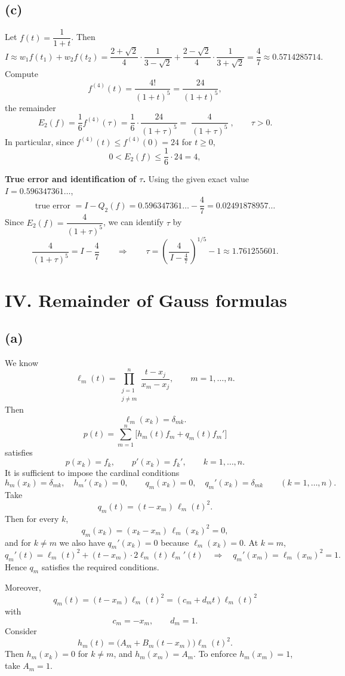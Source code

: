 \documentclass[a4paper]{article}
\begin{document}
\subsection*{(c)}
Let \(f(t)=\dfrac{1}{1+t}\). Then
\[
I \approx w_1 f(t_1)+w_2 f(t_2)
=\frac{2+\sqrt2}{4}\cdot\frac{1}{3-\sqrt2}
+\frac{2-\sqrt2}{4}\cdot\frac{1}{3+\sqrt2}
=\frac{4}{7}\approx 0.5714285714.
\]
Compute
\[
f^{(4)}(t)=\frac{4!}{(1+t)^5}=\frac{24}{(1+t)^5},
\]
the remainder
\[
E_2(f)=\frac{1}{6}f^{(4)}(\tau)=\frac{1}{6}\cdot\frac{24}{(1+\tau)^5}
=\boxed{\;\frac{4}{(1+\tau)^5}\;},\qquad \tau>0.
\]
In particular, since \(f^{(4)}(t)\le f^{(4)}(0)=24\) for \(t\ge 0\),
\[
0<E_2(f)\le \frac{1}{6}\cdot 24 = 4,
\]

\medskip
\noindent\textbf{True error and identification of \(\tau\).}
Using the given exact value \(I=0.596347361\ldots\),
\[
\text{true error }=I-Q_2(f)=0.596347361\ldots-\frac{4}{7}
=0.02491878957\ldots
\]
Since \(E_2(f)=\dfrac{4}{(1+\tau)^5}\), we can identify \(\tau\) by
\[
\frac{4}{(1+\tau)^5}=I-\frac{4}{7}
\qquad\Rightarrow\qquad
\tau=\left(\frac{4}{\,I-\frac{4}{7}\,}\right)^{1/5}-1
\approx 1.761255601.
\]



\section*{IV. Remainder of Gauss formulas}
\subsection*{(a)}
We know
\[
\ell_m(t)=\prod_{\substack{j=1\\ j\neq m}}^{n}\frac{t-x_j}{x_m-x_j},
\qquad m=1,\dots,n.
\]
Then
\[
\ell_m(x_k)=\delta_{mk}.
\]
\[
p(t)=\sum_{m=1}^{n}\bigl[h_m(t)f_m+q_m(t)f_m'\bigr]
\]
satisfies
\[
p(x_k)=f_k,\qquad p'(x_k)=f_k',\qquad k=1,\dots,n.
\]
It is sufficient to impose the cardinal conditions
\[
h_m(x_k)=\delta_{mk},\quad h_m'(x_k)=0,\qquad
q_m(x_k)=0,\quad q_m'(x_k)=\delta_{mk}
\qquad (k=1,\dots,n).
\]
Take
\[
q_m(t)=(t-x_m)\,\ell_m(t)^2.
\]
Then for every \(k\),
\[
q_m(x_k)=(x_k-x_m)\,\ell_m(x_k)^2=0,
\]
and for \(k\neq m\) we also have \(q_m'(x_k)=0\) because \(\ell_m(x_k)=0\).
At \(k=m\),
\[
q_m'(t)=\ell_m(t)^2+(t-x_m)\cdot 2\ell_m(t)\ell_m'(t)
\quad\Rightarrow\quad
q_m'(x_m)=\ell_m(x_m)^2=1.
\]
Hence \(q_m\) satisfies the required conditions.

Moreover,
\[
q_m(t)=(t-x_m)\ell_m(t)^2=(c_m+d_m t)\ell_m(t)^2
\]
with
\[
\boxed{c_m=-x_m,\qquad d_m=1.}
\]
Consider
\[
h_m(t)=\bigl(A_m+B_m(t-x_m)\bigr)\ell_m(t)^2.
\]
Then \(h_m(x_k)=0\) for \(k\neq m\), and \(h_m(x_m)=A_m\).
To enforce \(h_m(x_m)=1\), take \(A_m=1\).
\end{document}
